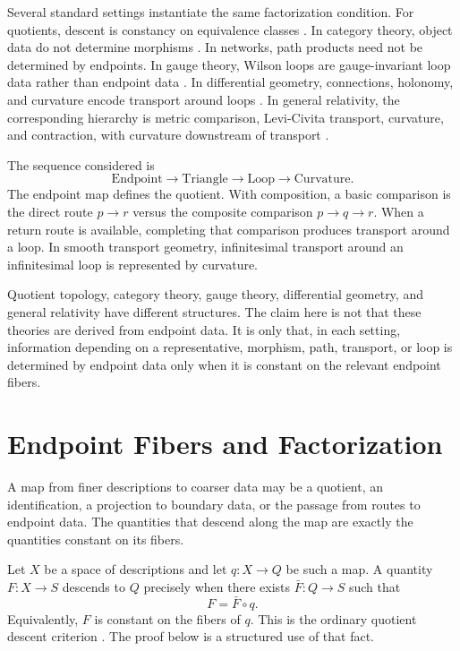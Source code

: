 \documentclass[12pt]{article}
\newcommand{\citep}[1]{\cite{#1}}
\begin{document}
Several standard settings instantiate the same factorization condition.
For quotients, descent is constancy on equivalence classes
\citep{Munkres2000}. In category theory, object data do not determine
morphisms \citep{EilenbergMacLane1945,MacLane1998}. In networks, path
products need not be determined by endpoints. In gauge theory, Wilson
loops are gauge-invariant loop data rather than endpoint data
\citep{Wilson1974}.
In differential geometry, connections, holonomy, and curvature encode
transport around loops
\citep{Ehresmann1950,AmbroseSinger1953,KobayashiNomizu1963,Nakahara2003}.
In general relativity, the corresponding hierarchy is metric comparison,
Levi-Civita transport, curvature, and contraction, with curvature
downstream of transport \citep{Einstein1916,Wald1984,Malament2012,Carroll2019}.

The sequence considered is
\[
  \boxed{\text{Endpoint}\longrightarrow\text{Triangle}
  \longrightarrow\text{Loop}\longrightarrow\text{Curvature}.}
\]
The endpoint map defines the quotient. With composition, a basic
comparison is the direct route $p\to r$ versus the composite comparison
$p\to q\to r$.
When a return route is available, completing that comparison produces
transport around a loop. In smooth
transport geometry, infinitesimal transport around an infinitesimal loop
is represented by curvature.

Quotient topology, category theory, gauge theory, differential geometry,
and general relativity have different structures. The claim here is not
that these theories are derived from endpoint data. It is only that, in
each setting, information depending on a representative, morphism, path,
transport, or loop is determined by endpoint data only when it is
constant on the relevant endpoint fibers.

\section{Endpoint Fibers and Factorization}
\label{sec:bottleneck}

A map from finer descriptions to coarser data may be a quotient, an
identification, a projection to boundary data, or the passage from routes
to endpoint data. The quantities that descend along the map are exactly
the quantities constant on its fibers.

Let $X$ be a space of descriptions and let $q:X\to Q$ be such a map.
A quantity $F:X\to S$ descends to $Q$ precisely when there exists
$\bar F:Q\to S$ such that
\[
  F=\bar F\circ q.
\]
Equivalently, $F$ is constant on the fibers of $q$. This is the ordinary
quotient descent criterion \citep{Munkres2000}. The proof below is a
structured use of that fact.
\end{document}

